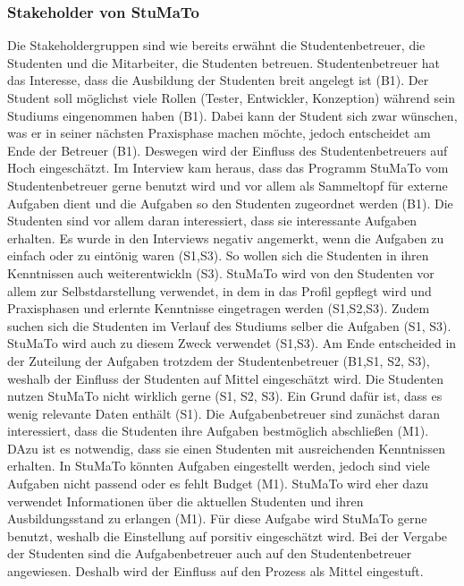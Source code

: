 \documentclass[
  12pt,
  ngerman,
  a4paper,
]{article}
\begin{document}
\hypertarget{stakeholder-von-stumato}{%
\subsubsection{Stakeholder von StuMaTo}\label{stakeholder-von-stumato}}

Die Stakeholdergruppen sind wie bereits erwähnt die Studentenbetreuer,
die Studenten und die Mitarbeiter, die Studenten betreuen.
Studentenbetreuer hat das Interesse, dass die Ausbildung der Studenten
breit angelegt ist (B1). Der Student soll möglichst viele Rollen
(Tester, Entwickler, Konzeption) während sein Studiums eingenommen haben
(B1). Dabei kann der Student sich zwar wünschen, was er in seiner
nächsten Praxisphase machen möchte, jedoch entscheidet am Ende der
Betreuer (B1). Deswegen wird der Einfluss des Studentenbetreuers auf
Hoch eingeschätzt. Im Interview kam heraus, dass das Programm StuMaTo
vom Studentenbetreuer gerne benutzt wird und vor allem als Sammeltopf
für externe Aufgaben dient und die Aufgaben so den Studenten zugeordnet
werden (B1). Die Studenten sind vor allem daran interessiert, dass sie
interessante Aufgaben erhalten. Es wurde in den Interviews negativ
angemerkt, wenn die Aufgaben zu einfach oder zu eintönig waren (S1,S3).
So wollen sich die Studenten in ihren Kenntnissen auch weiterentwickln
(S3). StuMaTo wird von den Studenten vor allem zur Selbstdarstellung
verwendet, in dem in das Profil gepflegt wird und Praxisphasen und
erlernte Kenntnisse eingetragen werden (S1,S2,S3). Zudem suchen sich die
Studenten im Verlauf des Studiums selber die Aufgaben (S1, S3). StuMaTo
wird auch zu diesem Zweck verwendet (S1,S3). Am Ende entscheided in der
Zuteilung der Aufgaben trotzdem der Studentenbetreuer (B1,S1, S2, S3),
weshalb der Einfluss der Studenten auf Mittel eingeschätzt wird. Die
Studenten nutzen StuMaTo nicht wirklich gerne (S1, S2, S3). Ein Grund
dafür ist, dass es wenig relevante Daten enthält (S1). Die
Aufgabenbetreuer sind zunächst daran interessiert, dass die Studenten
ihre Aufgaben bestmöglich abschließen (M1). DAzu ist es notwendig, dass
sie einen Studenten mit ausreichenden Kenntnissen erhalten. In StuMaTo
könnten Aufgaben eingestellt werden, jedoch sind viele Aufgaben nicht
passend oder es fehlt Budget (M1). StuMaTo wird eher dazu verwendet
Informationen über die aktuellen Studenten und ihren Ausbildungsstand zu
erlangen (M1). Für diese Aufgabe wird StuMaTo gerne benutzt, weshalb die
Einstellung auf porsitiv eingeschätzt wird. Bei der Vergabe der
Studenten sind die Aufgabenbetreuer auch auf den Studentenbetreuer
angewiesen. Deshalb wird der Einfluss auf den Prozess als Mittel
eingestuft.
\end{document}
